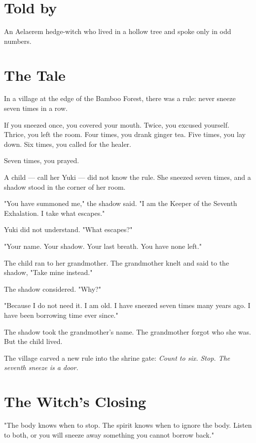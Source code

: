 \documentclass[10pt,twoside]{book}
\begin{document}
\section*{Told by}
An Aelaerem hedge-witch who lived in a hollow tree and spoke only in odd numbers.

\section*{The Tale}
In a village at the edge of the Bamboo Forest, there was a rule: never sneeze seven times in a row.

If you sneezed once, you covered your mouth. Twice, you excused yourself. Thrice, you left the room. Four times, you drank ginger tea. Five times, you lay down. Six times, you called for the healer.

Seven times, you prayed.

A child --- call her Yuki --- did not know the rule. She sneezed seven times, and a shadow stood in the corner of her room.

"You have summoned me," the shadow said. "I am the Keeper of the Seventh Exhalation. I take what escapes."

Yuki did not understand. "What escapes?"

"Your name. Your shadow. Your last breath. You have none left."

The child ran to her grandmother. The grandmother knelt and said to the shadow, "Take mine instead."

The shadow considered. "Why?"

"Because I do not need it. I am old. I have sneezed seven times many years ago. I have been borrowing time ever since."

The shadow took the grandmother's name. The grandmother forgot who she was. But the child lived.

The village carved a new rule into the shrine gate: \textit{Count to six. Stop. The seventh sneeze is a door.}

\section*{The Witch's Closing}
"The body knows when to stop. The spirit knows when to ignore the body. Listen to both, or you will sneeze away something you cannot borrow back."
\end{document}
